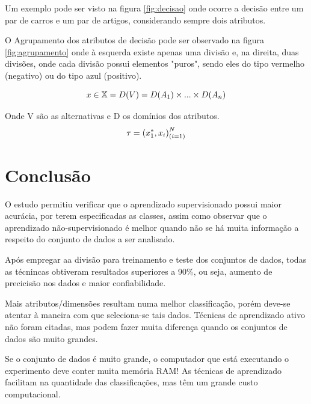 \documentclass[12pt]{article}
\begin{document}
 Um exemplo pode ser visto na figura \ref{fig:decisao} onde ocorre a decisão entre um par de carros e um par de artigos, considerando sempre dois atributos.
 
 O Agrupamento dos atributos de decisão pode ser observado na figura \ref{fig:agrupamento} onde à esquerda existe apenas uma divisão e, na direita, duas divisões, onde cada divisão possui elementos "puros", sendo eles do tipo vermelho (negativo) ou do tipo azul (positivo).
 
\begin{equation}
\centering
x\in\mathbb{X}={D(V)}={D(A_1)}\times{...}\times{D(A_n)}
\end{equation}

Onde V são as alternativas e D os domínios dos atributos.
\begin{equation}
\centering
\tau={(x_1^{*},x_i)}_{(i=1)}^{N}
\end{equation}

\section{Conclusão} \label{sec:conclusao}

O estudo permitiu verificar que o aprendizado supervisionado possui maior acurácia, por terem especificadas as classes, assim como observar que o aprendizado não-supervisionado é melhor quando não se há muita informação a respeito do conjunto de dados a ser analisado.

Após empregar aa divisão para treinamento e teste dos conjuntos de dados, todas as técnincas obtiveram resultados superiores a 90\%, ou seja, aumento de precicisão nos dados e maior confiabilidade.

Mais atributos/dimensões resultam numa melhor classificação, porém deve-se atentar à maneira com que seleciona-se tais dados. Técnicas de aprendizado ativo não foram citadas, mas podem fazer muita diferença quando os conjuntos de dados são muito grandes.

Se o conjunto de dados é muito grande, o computador que está executando o experimento deve conter muita memória RAM! As técnicas de aprendizado facilitam na quantidade das classificações, mas têm um grande custo computacional.



\end{document}
